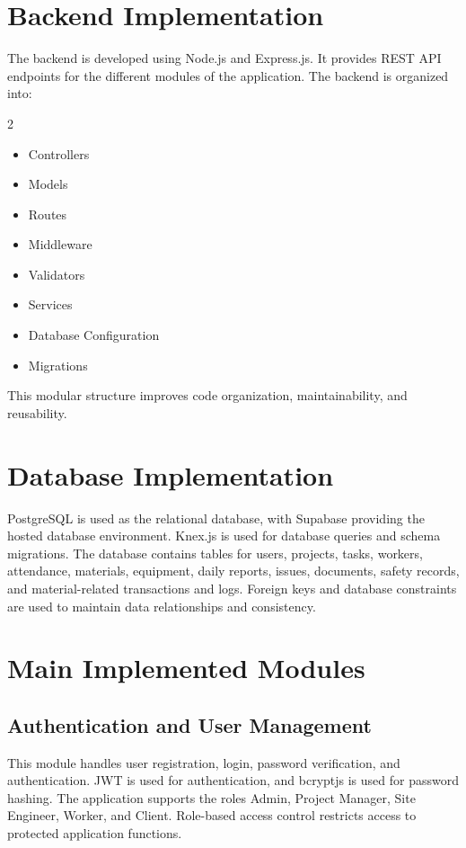 \documentclass[11pt,a4paper]{article}
\begin{document}
\section{Backend Implementation}
The backend is developed using Node.js and Express.js. It provides REST API endpoints for the different modules of the application. The backend is organized into:
\begin{multicols}{2}
\begin{itemize}
\item Controllers
\item Models
\item Routes
\item Middleware
\item Validators
\item Services
\item Database Configuration
\item Migrations
\end{itemize}
\end{multicols}
This modular structure improves code organization, maintainability, and reusability.

\section{Database Implementation}
PostgreSQL is used as the relational database, with Supabase providing the hosted database environment. Knex.js is used for database queries and schema migrations. The database contains tables for users, projects, tasks, workers, attendance, materials, equipment, daily reports, issues, documents, safety records, and material-related transactions and logs. Foreign keys and database constraints are used to maintain data relationships and consistency.

\section{Main Implemented Modules}
\subsection{Authentication and User Management}
This module handles user registration, login, password verification, and authentication. JWT is used for authentication, and bcryptjs is used for password hashing. The application supports the roles Admin, Project Manager, Site Engineer, Worker, and Client. Role-based access control restricts access to protected application functions.
\end{document}

